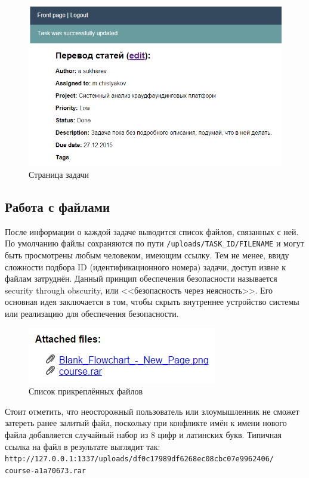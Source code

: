 \documentclass[a4paper, 14pt]{extarticle}
\begin{document}
\begin{figure}[!htb]
  \centering
    \includegraphics[scale=0.6]{../shared_images/frontend/task-view.png}
   \caption{Страница задачи}
    \label{fig:start}
\end{figure}

\subsection{Работа с файлами}

После информации о каждой задаче выводится список файлов, связанных с ней. По умолчанию файлы сохраняются по пути {\tt /uploads/TASK\_ID/FILENAME} и могут быть просмотрены любым человеком, имеющим ссылку. Тем не менее, ввиду сложности подбора ID (идентификационного номера) задачи, доступ извне к файлам затруднён. Данный принцип обеспечения безопасности называется security through obscurity, или <<безопасность через неясность>>. Его основная идея заключается в том, чтобы скрыть внутреннее устройство системы или реализацию для обеспечения безопасности.

\begin{figure}[!htb]
  \centering
    \includegraphics[scale=0.75]{../shared_images/frontend/files.png}
   \caption{Список прикреплённых файлов}
    \label{fig:start}
\end{figure}

Стоит отметить, что неосторожный пользователь или злоумышленник не сможет затереть ранее залитый файл, поскольку при конфликте имён к имени нового файла добавляется случайный набор из 8 цифр и латинских букв. Типичная ссылка на файл в результате выглядит так: \\
{\tt http://127.0.0.1:1337/uploads/df0c17989df6268ec08cbc07e9962406/ \\
course-a1a70673.rar}
\end{document}
